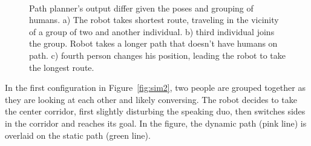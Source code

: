 \documentclass{tADR2e}
\begin{document}
\begin{figure}[ht!]
\centering
%
         \\
        
    \caption{%
	Path planner's output differ given the poses and grouping of humans. a) The robot takes shortest route, traveling in the vicinity of a group of two and another individual. b) third individual joins the group. Robot takes a longer path that doesn't have humans on path. c) fourth person changes his position, leading the robot to take the longest route.
     }%
   \label{fig:sim}
\end{figure}



In the first configuration in Figure~\ref{fig:sim2}, two people are grouped together as they are looking at each other and likely conversing. The robot decides to take the center corridor, first slightly disturbing the speaking duo, then switches sides in the corridor and reaches its goal. In the figure, the dynamic path (pink line) is overlaid on the static path (green line). 
\end{document}
